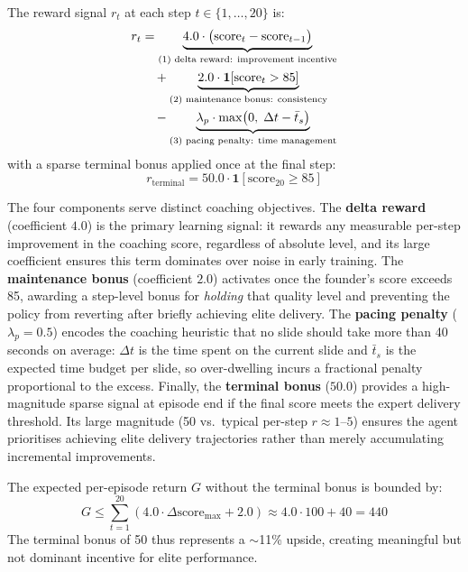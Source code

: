 \documentclass{article}
\begin{document}
The reward signal $r_t$ at each step $t \in \{1,\ldots,20\}$ is:
\begin{align}
r_t &= \underbrace{4.0 \cdot \bigl(\text{score}_t - \text{score}_{t-1}\bigr)}_{\text{(1) delta reward: improvement incentive}}
\notag\\
    &\quad + \underbrace{2.0 \cdot \mathbf{1}\!\left[\text{score}_t > 85\right]}_{\text{(2) maintenance bonus: consistency}}
\notag\\
    &\quad - \underbrace{\lambda_p \cdot \max\!\left(0,\; \Delta t - \bar{t}_s\right)}_{\text{(3) pacing penalty: time management}}
\label{eq:reward}
\end{align}
with a sparse terminal bonus applied once at the final step:
\begin{equation}
r_{\text{terminal}} = 50.0 \cdot \mathbf{1}\!\left[\text{score}_{20} \geq 85\right]
\label{eq:terminal_bonus}
\end{equation}

The four components serve distinct coaching objectives.
The \textbf{delta reward} (coefficient $4.0$) is the primary learning signal:
it rewards any measurable per-step improvement in the coaching score,
regardless of absolute level, and its large coefficient ensures this term
dominates over noise in early training.
The \textbf{maintenance bonus} (coefficient $2.0$) activates once the
founder's score exceeds 85, awarding a step-level bonus for \emph{holding}
that quality level and preventing the policy from reverting after briefly
achieving elite delivery.
The \textbf{pacing penalty} ($\lambda_p = 0.5$) encodes the coaching
heuristic that no slide should take more than 40 seconds on average:
$\Delta t$ is the time spent on the current slide and $\bar{t}_s$ is
the expected time budget per slide, so over-dwelling incurs a fractional
penalty proportional to the excess.
Finally, the \textbf{terminal bonus} ($50.0$) provides a high-magnitude
sparse signal at episode end if the final score meets the expert delivery
threshold. Its large magnitude (50 vs.\ typical per-step $r \approx 1$--$5$)
ensures the agent prioritises achieving elite delivery trajectories rather
than merely accumulating incremental improvements.

The expected per-episode return $G$ without the terminal bonus is bounded by:
\begin{equation}
G \leq \sum_{t=1}^{20}\left(4.0 \cdot \Delta\text{score}_{\max} + 2.0\right)
   \approx 4.0 \cdot 100 + 40 = 440
\label{eq:return_bound}
\end{equation}
The terminal bonus of 50 thus represents a $\sim$11\% upside, creating
meaningful but not dominant incentive for elite performance.
\end{document}
